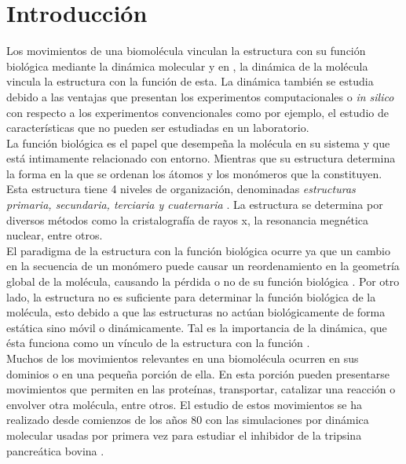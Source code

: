 \chapter*{Introducci\'{o}n}
Los movimientos de una biomol\'{e}cula vinculan la estructura con su funci\'{o}n biol\'{o}gica mediante la din\'{a}mica molecular \cite{Lezon2009} y en  \cite{Rader2006}, la din\'{a}mica de la mol\'{e}cula vincula la estructura con la funci\'{o}n de esta. La din\'{a}mica tambi\'{e}n se estudia debido a las ventajas que presentan los experimentos computacionales o \textit{in silico} con respecto a los experimentos convencionales como por ejemplo, el estudio de caracter\'{i}sticas que no pueden ser estudiadas en un laboratorio.\\

La funci\'{o}n biol\'{o}gica es el papel que desempe\~{n}a la mol\'{e}cula en su sistema y que est\'{a} intimamente relacionado con entorno. Mientras que su estructura determina la forma en la que se ordenan los \'{a}tomos y los mon\'{o}meros que la constituyen. Esta estructura tiene 4 niveles de organizaci\'{o}n, denominadas \textit{estructuras primaria, secundaria, terciaria y cuaternaria} \cite{Kuchel}. La estructura se determina por diversos m\'{e}todos como la cristalograf\'{i}a de rayos x, la resonancia megn\'{e}tica nuclear, entre otros.\\

El paradigma de la estructura con la funci\'{o}n biol\'{o}gica ocurre ya que un cambio en la secuencia de un mon\'{o}mero puede causar un reordenamiento en la geometr\'{i}a global de la mol\'{e}cula, causando la p\'{e}rdida o no de su funci\'{o}n biol\'{o}gica \cite{Dykeman2010NormalPhysics}. Por otro lado, la estructura no es suficiente para determinar la funci\'{o}n biol\'{o}gica de la mol\'{e}cula, esto debido a que las estructuras no act\'{u}an biol\'{o}gicamente de forma est\'{a}tica sino m\'{o}vil o din\'{a}micamente. Tal es  la importancia de la din\'{a}mica, que \'{e}sta funciona como un v\'{i}nculo de la estructura con la funci\'{o}n \cite{Bahar2005Coarse-grainedBiology}.\\

Muchos de los movimientos relevantes en una biomol\'{e}cula ocurren en sus dominios o en una peque\~{n}a porci\'{o}n de ella. En esta porci\'{o}n pueden presentarse movimientos que permiten en las prote\'{i}nas, transportar, catalizar una reacci\'{o}n o envolver otra mol\'{e}cula, entre otros. El estudio de estos movimientos se ha realizado desde comienzos de los a\~{n}os 80 con las simulaciones por din\'{a}mica molecular usadas por primera vez para estudiar el inhibidor de la tripsina pancre\'{a}tica bovina  \cite{Bahar2005Coarse-grainedBiology}.\\

